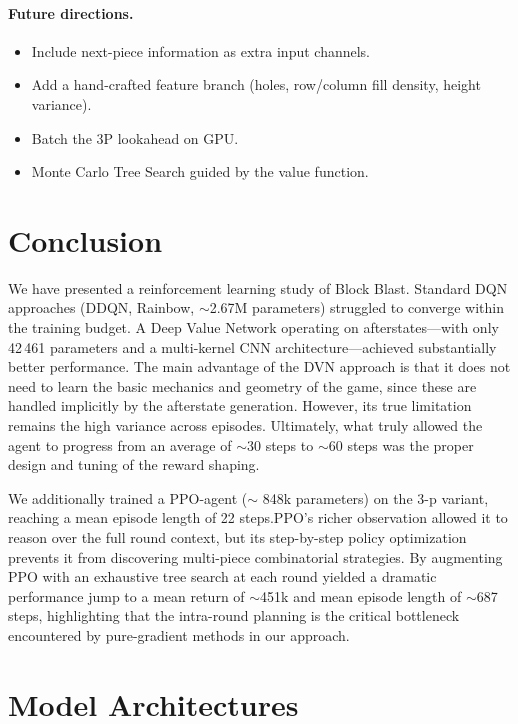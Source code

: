 \documentclass[10pt]{article}
\begin{document}
\paragraph{Future directions.}
\begin{itemize}
    \item Include next-piece information as extra input channels.
    \item Add a hand-crafted feature branch (holes, row/column fill density, height variance).
    \item Batch the 3P lookahead on GPU.
    \item Monte Carlo Tree Search guided by the value function.
\end{itemize}

\section{Conclusion}

We have presented a reinforcement learning study of Block Blast. Standard DQN approaches (DDQN, Rainbow, $\sim$2.67M parameters) struggled to converge within the training budget. A Deep Value Network operating on afterstates---with only 42\,461 parameters and a multi-kernel CNN architecture---achieved substantially better performance. The main advantage of the DVN approach is that it does not need to learn the basic mechanics and geometry of the game, since these are handled implicitly by the afterstate generation. However, its true limitation remains the high variance across episodes. Ultimately, what truly allowed the agent to progress from an average of $\sim$30 steps to $\sim$60 steps was the proper design and tuning of the reward shaping.

We additionally trained a PPO-agent ($\sim$ 848k parameters) on the 3-p variant, reaching a mean episode length of 22 steps.PPO's richer observation allowed it to reason over the full round context, but its step-by-step policy optimization prevents it from discovering multi-piece combinatorial strategies. By augmenting PPO with an exhaustive tree search at each round yielded a dramatic performance jump to a mean return of $\sim$451k and mean episode length of $\sim$687 steps, highlighting that the intra-round planning is the critical bottleneck encountered by pure-gradient methods in our approach.
\newpage
\appendix
\section{Model Architectures}
\end{document}
